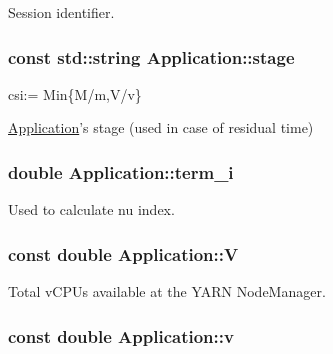 Session identifier. 

\hypertarget{classApplication_a27731ed4d16f6e9583b52c4f09a69258}{
\subsubsection[{stage}]{\setlength{\rightskip}{0pt plus 5cm}const std\-::string Application\-::stage\hspace{0.3cm}{\ttfamily [private]}}}\label{classApplication_a27731ed4d16f6e9583b52c4f09a69258}


csi\-:= Min\{M/m,V/v\} 

\hyperlink{classApplication}{Application}'s stage (used in case of residual time) \hypertarget{classApplication_ad5486702327ad61e56ed04fb54d58c20}{
\subsubsection[{term\-\_\-i}]{\setlength{\rightskip}{0pt plus 5cm}double Application\-::term\-\_\-i\hspace{0.3cm}{\ttfamily [private]}}}\label{classApplication_ad5486702327ad61e56ed04fb54d58c20}


Used to calculate nu index. 

\hypertarget{classApplication_a03a99fa3553c376653e53bb5f489c316}{
\subsubsection[{V}]{\setlength{\rightskip}{0pt plus 5cm}const double Application\-::\-V\hspace{0.3cm}{\ttfamily [private]}}}\label{classApplication_a03a99fa3553c376653e53bb5f489c316}


Total v\-C\-P\-Us available at the Y\-A\-R\-N Node\-Manager. 

\hypertarget{classApplication_a57853498c230af817bc4173169847bfc}{
\subsubsection[{v}]{\setlength{\rightskip}{0pt plus 5cm}const double Application\-::v\hspace{0.3cm}{\ttfamily [private]}}}\label{classApplication_a57853498c230af817bc4173169847bfc}


